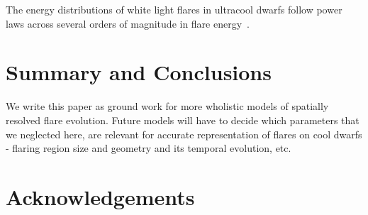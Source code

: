 \documentclass[fleqn,usenatbib,letters]{mnras}%
\begin{document}
The energy distributions of white light flares in ultracool dwarfs follow power laws across several orders of magnitude in flare energy~\citep{gizis2017b, paudel2018}.
%
\section{Summary and Conclusions}
\label{sec:summary}

We write this paper as ground work for more wholistic models of spatially resolved flare evolution. Future models will have to decide which parameters that we neglected here, are relevant for accurate representation of flares on cool dwarfs - flaring region size and geometry and its temporal evolution, etc.
\section*{Acknowledgements}
\end{document}
